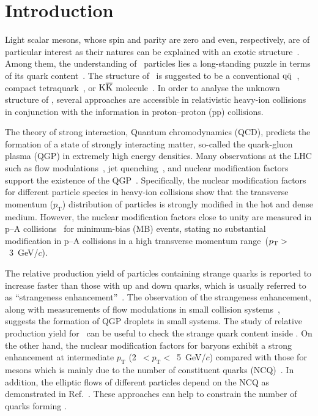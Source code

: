 
\section{Introduction}

Light scalar mesons, whose spin and parity are zero and even, respectively, are of particular interest as their natures can be explained with an exotic structure~\cite{ParticleDataGroup:2020ssz}. Among them, the understanding of \fzero\ particles lies a long-standing puzzle in terms of its quark content~\cite{ExHIC:2010gcb, Jaffe:1976ig, Maiani:2004uc}. The structure of \fzero\ is suggested to be a conventional $\rm{}q\bar{q}$~\cite{Chen:2003za}, compact tetraquark~\cite{Achasov:2020aun}, or $\rm{}K\overline{K}$ molecule~\cite{Ahmed:2020kmp}. In order to analyse the unknown structure of \fzero, several approaches are accessible in relativistic heavy-ion collisions in conjunction with the information in proton--proton (pp) collisions. 

The theory of strong interaction, Quantum chromodynamics (QCD), predicts the formation of a state of strongly interacting matter, so-called the quark-gluon plasma (QGP) in extremely high energy densities. 
Many observations at the LHC such as flow modulations~\cite{Bhalerao:2020ulk, ALICE:2019zfl}, jet quenching~\cite{ALICE:2019qyj}, and nuclear modification factors~\cite{ALICE:2019hno} support the existence of the QGP~\cite{Adams:2005dq}. 
Specifically, the nuclear modification factors for different particle species in heavy-ion collisions show that the transverse momentum ($p_{\mathrm{T}}$) distribution of particles is strongly modified in the hot and dense medium. However, the nuclear modification factors close to unity are measured in p--A collisions~\cite{ALICE:2016dei} for minimum-bias (MB) events, stating no substantial modification in p--A collisions in a high transverse momentum range~($p_{\rm{T}}>$~3~GeV/$c$). 

The relative production yield of particles containing strange quarks is reported to increase faster than those with up and down quarks, which is usually referred to as ``strangeness enhancement''~\cite{ALICE:2016fzo}. The observation of the strangeness enhancement, along with measurements of flow modulations in small collision systems~\cite{PHENIX:2018lia, ALICE:2021nir}, suggests the formation of QGP droplets in small systems. The study of relative production yield for \fzero\ can be useful to check the strange quark content inside \fzero. On the other hand, the nuclear modification factors for baryons exhibit a strong enhancement at intermediate $p_{\mathrm{T}}$ (2~$<p_{\mathrm{T}}<$~5~GeV/$c$) compared with those for mesons which is mainly due to the number of constituent quarks (NCQ)~\cite{Cronin:1974zm, Fries:2003vb}. In addition, the elliptic flows of different particles depend on the NCQ as demonstrated in Ref.~\cite{Wang:2022det}. These approaches can help to constrain the number of quarks forming \fzero.

